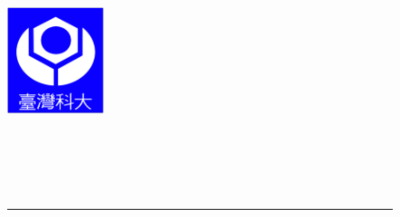 
\newcommand\itsempty{}
%
\begin{titlepage}

\begin{center}
%
\large



\begin{figure}[htbp]
	\begin{minipage}[b]{5cm} 
		\raggedright
		\includegraphics[width=1.1in]{frontpages/ncku_logo.eps}
		\label{fig:ncku_logo}
	\end{minipage}%
	\begin{minipage}[b]{0.5\textwidth} 
	\centering
	\makebox[3cm][c]{\Huge{\univCname}}\\  %
	\vspace{0.5cm}
	\makebox[3cm][c]{\Huge{\deptCname}}\\ %
	\vspace{0.5cm}
	\end{minipage}%
\\ 
\rule{16cm}{3pt}
\end{figure}



\end{center}
\end{titlepage}
